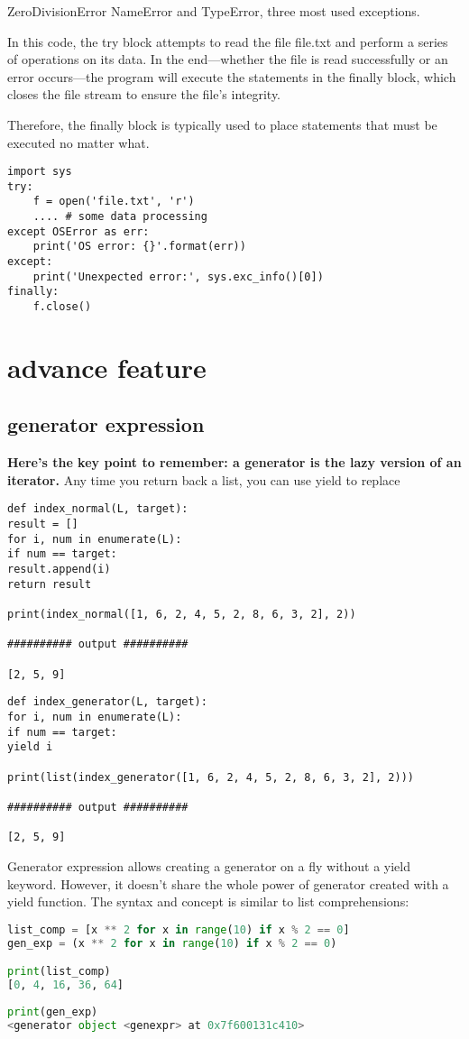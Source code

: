 \documentclass[a4paper,12pt,twoside]{book}
\begin{document}
ZeroDivisionError NameError and TypeError, three most used exceptions.

In this code, the try block attempts to read the file file.txt and perform a series of operations on its data. In the end—whether the file is read successfully or an error occurs—the program will execute the statements in the finally block, which closes the file stream to ensure the file’s integrity.

Therefore, the finally block is typically used to place statements that must be executed no matter what.

\begin{lstlisting}
import sys
try:
	f = open('file.txt', 'r')
	.... # some data processing
except OSError as err:
	print('OS error: {}'.format(err))
except:
	print('Unexpected error:', sys.exc_info()[0])
finally:
	f.close()
\end{lstlisting}


	
\section{advance feature}
\subsection{generator expression}
\textbf{Here’s the key point to remember: a generator is the lazy version of an iterator.} Any time you return back a list, you can use yield to replace

\begin{lstlisting}
def index_normal(L, target):
result = []
for i, num in enumerate(L):
if num == target:
result.append(i)
return result

print(index_normal([1, 6, 2, 4, 5, 2, 8, 6, 3, 2], 2))

########## output ##########

[2, 5, 9]
\end{lstlisting}

\begin{lstlisting}
def index_generator(L, target):
for i, num in enumerate(L):
if num == target:
yield i

print(list(index_generator([1, 6, 2, 4, 5, 2, 8, 6, 3, 2], 2)))

########## output ##########

[2, 5, 9]
\end{lstlisting}


Generator expression allows creating a generator on a fly without a yield keyword. However, it doesn’t share the whole power of generator created with a yield function. The syntax and concept is similar to list comprehensions:
\begin{lstlisting}[frame=single, language=Python]
list_comp = [x ** 2 for x in range(10) if x % 2 == 0]
gen_exp = (x ** 2 for x in range(10) if x % 2 == 0)

print(list_comp)
[0, 4, 16, 36, 64]
	
print(gen_exp)
<generator object <genexpr> at 0x7f600131c410>  
\end{lstlisting}  
	
\end{document}
